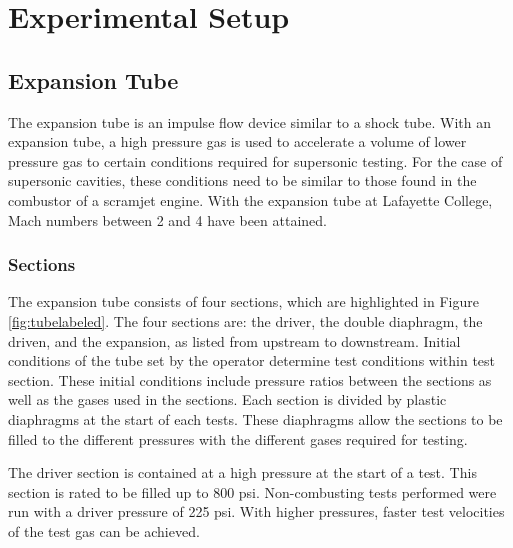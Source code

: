 
\chapter{Experimental Setup} %

\label{Chapter3} %



\section{Expansion Tube}

The expansion tube is an impulse flow device similar to a shock tube. With an expansion tube, a high pressure gas is used to accelerate a volume of lower pressure gas to certain conditions required for supersonic testing. For the case of supersonic cavities, these conditions need to be similar to those found in the combustor of a scramjet engine. With the expansion tube at Lafayette College, Mach numbers between 2 and 4 have been attained. 

\subsection{Sections}

The expansion tube consists of four sections, which are highlighted in Figure \ref{fig:tubelabeled}. The four sections are: the driver, the double diaphragm, the driven, and the expansion, as listed from upstream to downstream. Initial conditions of the tube set by the operator determine test conditions within test section. These initial conditions include pressure ratios between the sections as well as the gases used in the sections. Each section is divided by plastic diaphragms at the start of each tests. These diaphragms allow the sections to be filled to the different pressures with the different gases required for testing.

The driver section is contained at a high pressure at the start of a test. This section is rated to be filled up to 800 psi. Non-combusting tests performed were run with a driver pressure of 225 psi. With higher pressures, faster test velocities of the test gas can be achieved. 

